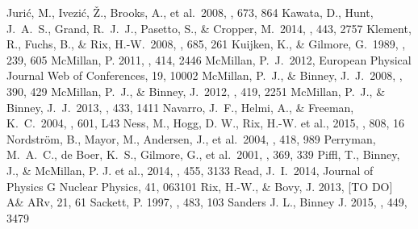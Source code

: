 \documentclass[12pt,preprint]{aastex}
\begin{document}
\begin{thebibliography}{}
 Juri{\'c}, M., Ivezi{\'c}, {\v Z}., Brooks, A., et al.\ 2008, \apj, 673, 864 
 Kawata, D., Hunt, J.~A.~S., Grand, R.~J.~J., Pasetto, S., \& Cropper, M.\ 2014, \mnras, 443, 2757 
 Klement, R., Fuchs, B., \& Rix, H.-W.\ 2008, \apj, 685, 261 
 Kuijken, K., \& Gilmore, G.\ 1989, \mnras, 239, 605 
 McMillan, P. 2011, \mnras, 414, 2446
 McMillan, P.~J.\ 2012, European Physical Journal Web of Conferences, 19, 10002 
 McMillan, P.~J., \& Binney, J.~J.\ 2008, \mnras, 390, 429 
 McMillan, P.~J., \& Binney, J.\ 2012, \mnras, 419, 2251 
 McMillan, P.~J., \& Binney, J.~J.\ 2013, \mnras, 433, 1411 
 Navarro, J.~F., Helmi, 
A., \& Freeman, K.~C.\ 2004, \apjl, 601, L43 
 Ness, M., Hogg, D. W., Rix, H.-W. et al., 2015, \apj, 808, 16
 Nordstr{\"o}m, B., Mayor, M., Andersen, J., et al.\ 2004, \aap, 418, 989 
 Perryman, M.~A.~C., de Boer, K.~S., Gilmore, G., et al.\ 2001, \aap, 369, 339 
 Piffl, T., Binney, J., \& McMillan, P. J. et al., 2014, \mnras, 455, 3133
 Read, J.~I.\ 2014, Journal of Physics G Nuclear Physics, 41, 063101 
 Rix, H.-W., \& Bovy, J. 2013, [TO DO] A\& ARv, 21, 61
 Sackett, P. 1997, \apj, 483, 103
 Sanders J. L., Binney J. 2015, \mnras, 449, 3479

\end{thebibliography}
\end{document}
